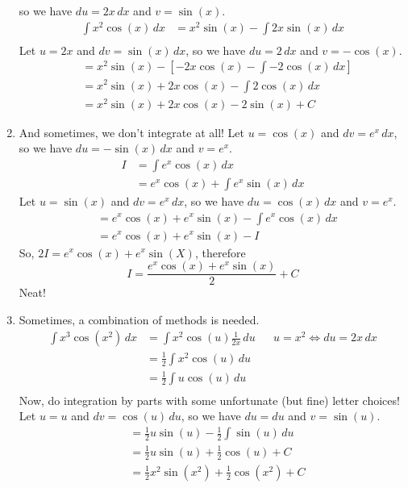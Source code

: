\begin{Example}{}{}
\begin{enumerate}[label=(\roman*)]
              so we have $ du=2x\,dx $ and $ v=\sin(x) $.
              \begin{align*}
                  \int x^2\cos(x)\, d{x}
                   & =x^2\sin(x)-\int 2x\sin(x)\, d{x} \\
              \end{align*}
              Let $ u=2x $ and $ dv=\sin(x)\,dx $, so we have $ du=2\,dx $ and $ v=-\cos(x) $.
              \begin{align*}
                   & =x^2\sin(x)-\left[-2x\cos(x)-\int -2\cos(x)\, d{x} \right] \\
                   & =x^2\sin(x)+2x\cos(x)-\int 2\cos(x)\, d{x}                 \\
                   & =x^2\sin(x)+2x\cos(x)-2\sin(x)+C
              \end{align*}
        \item And sometimes, we don't integrate at all! Let $ u=\cos(x) $
              and $ dv=e^x\,dx $, so we have $ du=-\sin(x)\,dx $ and $ v=e^x $.
              \begin{align*}
                  I & =\int e^x\cos(x)\, d{x}            \\
                    & =e^x\cos(x)+\int e^x\sin(x)\, d{x}
              \end{align*}
              Let $ u=\sin(x) $ and $ dv=e^x\,dx $, so we have $ du=\cos(x)\,dx $ and $ v=e^x $.
              \begin{align*}
                   & =e^x\cos(x)+e^x\sin(x)-\int e^x\cos(x)\, d{x} \\
                   & =e^x\cos(x)+e^x\sin(x)-I
              \end{align*}
              So, $ 2I=e^x\cos(x)+e^x\sin(X) $, therefore
              \[ I=\frac{e^x\cos(x)+e^x\sin(x)}{2} +C \]
              Neat!
        \item Sometimes, a combination of methods is needed.
              \begin{align*}
                  \int x^3\cos(x^2)\, d{x}
                   & =\int x^2\cos(u)\frac{1}{2x} \, d{u} &  & u=x^2\iff du=2x\,dx \\
                   & =\frac{1}{2} \int x^2\cos(u)\, d{u}                           \\
                   & =\frac{1}{2} \int u\cos(u)\, d{u}                             \\
              \end{align*}
              Now, do integration by parts with some unfortunate (but fine) letter
              choices! Let $ u=u $ and $ dv=\cos(u)\,du $, so we have $ du=du $
              and $ v=\sin(u) $.
              \begin{align*}
                   & =\frac{1}{2} u\sin(u)-\frac{1}{2} \int \sin(u)\, d{u} \\
                   & =\frac{1}{2} u\sin(u)+\frac{1}{2} \cos(u)+C           \\
                   & =\frac{1}{2} x^2\sin(x^2)+\frac{1}{2} \cos(x^2)+C
              \end{align*}
    \end{enumerate}
\end{Example}

